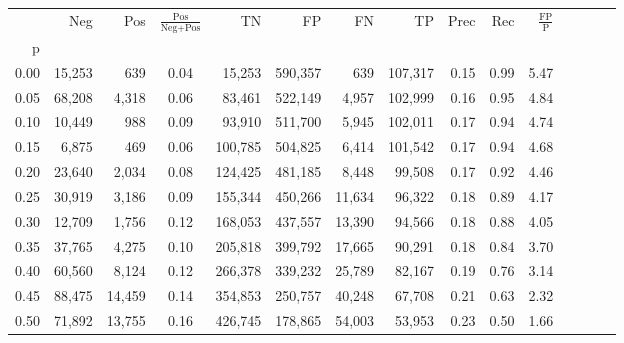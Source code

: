 \begin{tabular}{rrrcrrrrrrrrrrr}
\toprule
{} &     Neg &     Pos & $\frac{\text{Pos}}{\text{Neg}+\text{Pos}}$ &       TN &       FP &       FN &       TP &  Prec &   Rec & $\frac{\text{FP}}{\text{P}}$ \\
p    &         &         &                                            &          &          &          &          &       &       &                              \\
\midrule
0.00 &  15,253 &     639 &                                       0.04 &   15,253 &  590,357 &      639 &  107,317 &  0.15 &  0.99 &                         5.47 \\
0.05 &  68,208 &   4,318 &                                       0.06 &   83,461 &  522,149 &    4,957 &  102,999 &  0.16 &  0.95 &                         4.84 \\
0.10 &  10,449 &     988 &                                       0.09 &   93,910 &  511,700 &    5,945 &  102,011 &  0.17 &  0.94 &                         4.74 \\
0.15 &   6,875 &     469 &                                       0.06 &  100,785 &  504,825 &    6,414 &  101,542 &  0.17 &  0.94 &                         4.68 \\
0.20 &  23,640 &   2,034 &                                       0.08 &  124,425 &  481,185 &    8,448 &   99,508 &  0.17 &  0.92 &                         4.46 \\
0.25 &  30,919 &   3,186 &                                       0.09 &  155,344 &  450,266 &   11,634 &   96,322 &  0.18 &  0.89 &                         4.17 \\
0.30 &  12,709 &   1,756 &                                       0.12 &  168,053 &  437,557 &   13,390 &   94,566 &  0.18 &  0.88 &                         4.05 \\
0.35 &  37,765 &   4,275 &                                       0.10 &  205,818 &  399,792 &   17,665 &   90,291 &  0.18 &  0.84 &                         3.70 \\
0.40 &  60,560 &   8,124 &                                       0.12 &  266,378 &  339,232 &   25,789 &   82,167 &  0.19 &  0.76 &                         3.14 \\
0.45 &  88,475 &  14,459 &                                       0.14 &  354,853 &  250,757 &   40,248 &   67,708 &  0.21 &  0.63 &                         2.32 \\
0.50 &  71,892 &  13,755 &                                       0.16 &  426,745 &  178,865 &   54,003 &   53,953 &  0.23 &  0.50 &                         1.66 \\

\end{tabular}

